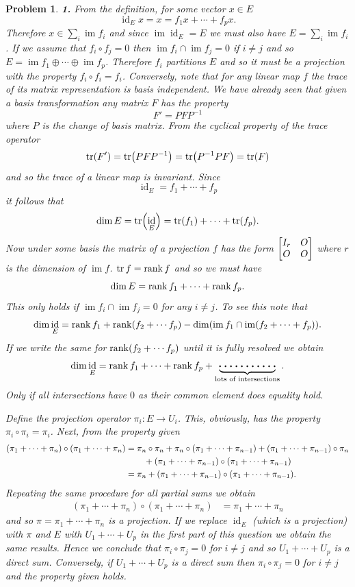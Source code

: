 \documentclass{article}
\newcommand{\subno}[1]{\par\noindent\textbf{#1}}
\newcommand{\hhd}{%
  \mathrel{%
    \tikz[baseline={([yshift=-.55ex]current bounding box.center)}]{
      \fill[black] (0,0) circle [radius=.8pt];
      \foreach \i in {1,2,...,5}{
      \fill[black] ({-.2*\i},0) circle [radius=.8pt];
      \fill[black] ({.2*\i},0) circle [radius=.8pt];
      }
    }
  }%
}%
\DeclareMathOperator{\im}{im}
\DeclareMathOperator{\id}{id}
\theoremstyle{pprop}
\newtheorem{problem}{Problem}[section]
\begin{document}
\begin{problem}
\subno{1.} From the definition, for some vector $x \in E$
\[
\id_E x = x = f_1 x + \cdots + f_p x.
\] 
Therefore $x \in \sum_i \im f_i$ and since $\im \id_E = E$ we must also have $E = \sum_i \im f_i$. If we assume that $f_i \circ f_j=0$ then 
$\im f_i \cap \im f_j = \qty{0}$ if $i \neq j$ and so $E = \im f_1 \oplus \cdots \oplus \im f_p$. Therefore $f_i$ partitions $E$ and so 
it must be a projection with the property $f_i \circ f_i = f_i$. Conversely, note that for any linear map $f$ the trace of 
its matrix representation is basis independent. We have already seen that given a basis transformation any matrix $F$ has the 
property
\[
F' = P F P^{-1}
\]
where $P$ is the change of basis matrix. From the cyclical property of the trace operator 
\[
\tr(F')=\tr(P F P^{-1})=\tr(P^{-1}PF)=\tr(F)
\]
and so the trace of a linear map is invariant. Since 
\[
\id_E = f_1 + \cdots + f_p 
\]
it follows that 
\[
\dim E =\tr(\id_E) = \tr(f_1) + \cdots + \tr(f_p).
\]
Now under some basis the matrix of a projection $f$ has the form $\mqty[I_r & O \\ O & O]$ where $r$ is the dimension of $\im f$.
$\tr f = \rank f$ and so we must have 
\[
\dim E = \rank f_1 + \cdots + \rank f_p.
\]
This only holds if $\im f_i \cap \im f_j = \qty{0}$ for any $i \neq j$. To see this note that  
\[
\dim \id_E = \rank f_1 + \rank (f_2+ \cdots f_p) - \dim (\im f_1 \cap \im( f_2+ \cdots + f_p)).  
\]
If we write the same for $\rank (f_2+ \cdots f_p)$ until it is fully resolved we obtain 
\[
\dim \id_E = \rank f_1 + \cdots + \rank f_p + \underbrace{\hhd}_{\text{lots of intersections}}.
\]
Only if all intersections have $0$ as their common element does equality hold.

Define the projection operator $\pi_i: E \to U_i$. This, obviously, has the property $\pi_i \circ \pi_i = \pi_i$. Next, from the property given 
\begin{align*}
  (\pi_1 + \cdots + \pi_n )\circ (\pi_1 + \cdots + \pi_n ) & = \pi_n \circ \pi _n + \pi_n \circ (\pi_1 +\cdots + \pi_{n-1} ) + (\pi_1 +\cdots + \pi_{n-1} ) \circ \pi_n\\
  & \kern5ex  + (\pi_1 +\cdots + \pi_{n-1} ) \circ (\pi_1 +\cdots + \pi_{n-1} ) \\
& = \pi_n + (\pi_1 +\cdots + \pi_{n-1} ) \circ (\pi_1 +\cdots + \pi_{n-1} ). 
\end{align*}
Repeating the same procedure for all partial sums we obtain 
\begin{align*}
  (\pi_1 + \cdots + \pi_n )\circ (\pi_1 + \cdots + \pi_n ) & = \pi_1 + \cdots + \pi_n
\end{align*}
and so $\pi=\pi_1 + \cdots + \pi_n$ is a projection. 
If we replace $\id_E$ (which is a projection) 
with $\pi$ and $E$ with $U_1+\cdots+U_p$ in the first part of this question we 
obtain the same results. Hence we conclude that $\pi_i \circ \pi_j=0$ for $i \neq j$ and so
$U_1 + \cdots + U_p$ is a direct sum. Conversely, if $U_1 + \cdots + U_p$ is a direct sum then $\pi_i \circ \pi_j=0$ for $i \neq j$
and the property given holds. 
\end{problem}
\end{document}
